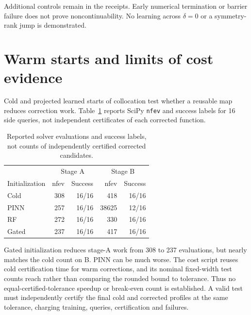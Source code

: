 \documentclass[12pt,a4paper,oneside]{report}
\numberwithin{equation}{chapter}
\theoremstyle{definition}
\theoremstyle{remark}\newtheorem{remark}[theorem]{Remark}
\DeclareRobustCommand{\code}[1]{\nolinkurl{#1}}
\newif\ifreviewmarks
\DeclareRobustCommand{\review}[1]{{\ifreviewmarks\color{authorblue}\fi #1}}
\begin{document}
\review{Additional controls remain in the receipts. Early numerical termination or barrier failure does not prove noncontinuability. No learning across $\delta=0$ or a symmetry-rank jump is demonstrated.}

\section{Warm starts and limits of cost evidence}\label{sec:cost}
\review{Cold and projected learned starts of collocation test whether a reusable map reduces correction work. Table~\ref{tab:work} reports SciPy \code{nfev} and success labels for 16 side queries, not independent certificates of each corrected function.}
\begin{table}[!ht]\centering\small
\begin{tabular}{@{}lrr|rr@{}}\toprule
&\multicolumn{2}{c}{Stage A}&\multicolumn{2}{c}{Stage B}\\
Initialization & nfev & Success & nfev & Success\\\midrule
Cold & 308 & 16/16 & 418 & 16/16\\
PINN & 257 & 16/16 & 38625 & 12/16\\
RF & 272 & 16/16 & 330 & 16/16\\
Gated & 237 & 16/16 & 417 & 16/16\\\bottomrule
\end{tabular}
\caption[Cold and learned-start solver work]{\review{Reported solver evaluations and success labels, not counts of independently certified corrected candidates.}}
\label{tab:work}
\end{table}
\review{Gated initialization reduces stage-A work from 308 to 237 evaluations, but nearly matches the cold count on B. PINN can be much worse. The cost script reuses cold certification time for warm corrections, and its nominal fixed-width test counts reach rather than comparing the rounded bound to tolerance. Thus no equal-certified-tolerance speedup or break-even count is established. A valid test must independently certify the final cold and corrected profiles at the same tolerance, charging training, queries, certification and failures.}

\FloatBarrier
\end{document}
